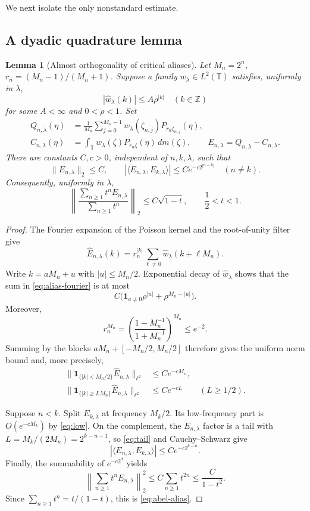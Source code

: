 \documentclass[11pt]{article}
\newtheorem{lemma}[theorem]{Lemma}
\newcommand{\T}{\mathbb T}
\newcommand{\dm}{\,dm}
\begin{document}
We next isolate the only nonstandard estimate.

\subsection{A dyadic quadrature lemma}

\begin{lemma}[Almost orthogonality of critical aliases]\label{lem:alias}
Let $M_n=2^n$, $r_n=(M_n-1)/(M_n+1)$.  Suppose a family
$w_\lambda\in L^2(\T)$ satisfies, uniformly in $\lambda$,
\[
 |\widehat w_\lambda(k)|\le A\rho^{|k|}
 \quad(k\in\mathbb Z)
\]
for some $A<\infty$ and $0<\rho<1$.  Set
\begin{align*}
 Q_{n,\lambda}(\eta)
 &=\frac1{M_n}\sum_{j=0}^{M_n-1}
 w_\lambda(\zeta_{n,j})P_{r_n\zeta_{n,j}}(\eta),\\
 C_{n,\lambda}(\eta)
 &=\int_\T w_\lambda(\zeta)P_{r_n\zeta}(\eta)\dm(\zeta),
 \qquad E_{n,\lambda}=Q_{n,\lambda}-C_{n,\lambda}.
\end{align*}
There are constants $C,c>0$, independent of $n,k,\lambda$, such that
\[
 \|E_{n,\lambda}\|_2\le C,
 \qquad
 |\langle E_{n,\lambda},E_{k,\lambda}\rangle|
 \le C e^{-c2^{|n-k|}}\quad(n\ne k).
\]
Consequently, uniformly in $\lambda$,
\begin{equation}\label{eq:abel-alias}
 \left\|
 \frac{\sum_{n\ge1}t^nE_{n,\lambda}}{\sum_{n\ge1}t^n}
 \right\|_2\le C\sqrt{1-t},\qquad \frac12<t<1.
\end{equation}
\end{lemma}

\begin{proof}
The Fourier expansion of the Poisson kernel and the root-of-unity filter give
\begin{equation}\label{eq:alias-fourier}
 \widehat E_{n,\lambda}(k)
 =r_n^{|k|}\sum_{\ell\ne0}
 \widehat w_\lambda(k+\ell M_n).
\end{equation}
Write $k=aM_n+u$ with $|u|\le M_n/2$.  Exponential decay of
$\widehat w_\lambda$ shows that the sum in \eqref{eq:alias-fourier} is at
most
\[
 C\bigl(\mathbf1_{a\ne0}\rho^{|u|}+\rho^{M_n-|u|}\bigr).
\]
Moreover,
\[
 r_n^{M_n}
 =\left(\frac{1-M_n^{-1}}{1+M_n^{-1}}\right)^{M_n}\le e^{-2}.
\]
Summing by the blocks $aM_n+[-M_n/2,M_n/2]$ therefore gives the uniform
norm bound and, more precisely,
\begin{align}
 \|\mathbf1_{\{|k|<M_n/2\}}\widehat E_{n,\lambda}\|_{\ell^2}
 &\le Ce^{-cM_n},\label{eq:low}\\
 \|\mathbf1_{\{|k|\ge LM_n\}}\widehat E_{n,\lambda}\|_{\ell^2}
 &\le Ce^{-cL}\qquad(L\ge1/2).\label{eq:tail}
\end{align}

Suppose $n<k$.  Split $E_{k,\lambda}$ at frequency $M_k/2$.
Its low-frequency part is $O(e^{-cM_k})$ by \eqref{eq:low}.  On the
complement, the $E_{n,\lambda}$ factor is a tail with
$L=M_k/(2M_n)=2^{k-n-1}$, so \eqref{eq:tail} and Cauchy--Schwarz give
\[
 |\langle E_{n,\lambda},E_{k,\lambda}\rangle|
 \le Ce^{-c2^{k-n}}.
\]
Finally, the summability of $e^{-c2^d}$ yields
\[
 \left\|\sum_{n\ge1}t^nE_{n,\lambda}\right\|_2^2
 \le C\sum_{n\ge1}t^{2n}\le\frac{C}{1-t^2}.
\]
Since $\sum_{n\ge1}t^n=t/(1-t)$, this is
\eqref{eq:abel-alias}.
\end{proof}
\end{document}
